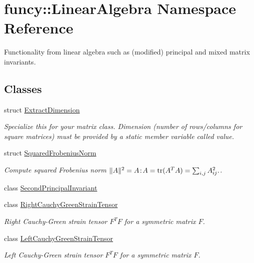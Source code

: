 \hypertarget{namespacefuncy_1_1LinearAlgebra}{\section{funcy\-:\-:Linear\-Algebra Namespace Reference}
\label{namespacefuncy_1_1LinearAlgebra}
}


Functionality from linear algebra such as (modified) principal and mixed matrix invariants.  


\subsection*{Classes}
\begin{DoxyCompactItemize}
\item 
struct \hyperlink{structfuncy_1_1LinearAlgebra_1_1ExtractDimension}{Extract\-Dimension}
\begin{DoxyCompactList}\small\item\em Specialize this for your matrix class. Dimension (number of rows/columns for square matrices) must be provided by a static member variable called value. \end{DoxyCompactList}\item 
struct \hyperlink{structfuncy_1_1LinearAlgebra_1_1SquaredFrobeniusNorm}{Squared\-Frobenius\-Norm}
\begin{DoxyCompactList}\small\item\em Compute squared Frobenius norm $ \|A\|^2 = A\negthinspace : \negthinspace A = \mathrm{tr}(A^TA) = \sum_{i,j} A_{ij}^2. $. \end{DoxyCompactList}\item 
class \hyperlink{classfuncy_1_1LinearAlgebra_1_1SecondPrincipalInvariant}{Second\-Principal\-Invariant}
\item 
class \hyperlink{classfuncy_1_1LinearAlgebra_1_1RightCauchyGreenStrainTensor}{Right\-Cauchy\-Green\-Strain\-Tensor}
\begin{DoxyCompactList}\small\item\em Right Cauchy-\/\-Green strain tensor $ F^T F $ for a symmetric matrix $ F $. \end{DoxyCompactList}\item 
class \hyperlink{classfuncy_1_1LinearAlgebra_1_1LeftCauchyGreenStrainTensor}{Left\-Cauchy\-Green\-Strain\-Tensor}
\begin{DoxyCompactList}\small\item\em Left Cauchy-\/\-Green strain tensor $ F^T F $ for a symmetric matrix $ F $. \end{DoxyCompactList}\item 

\end{DoxyCompactItemize}

